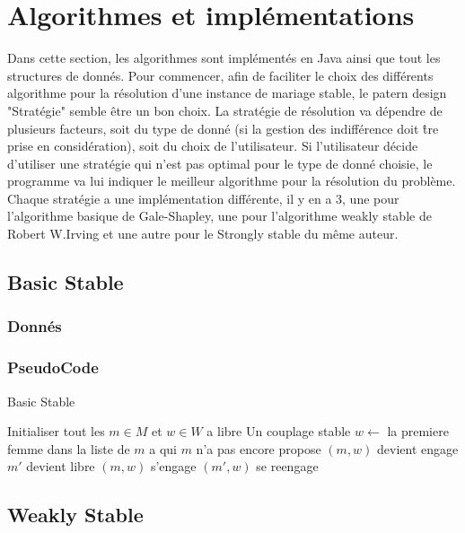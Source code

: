 \documentclass[11pt]{article}
\begin{document}
\section{Algorithmes et impl\'ementations}\label{algo}
Dans cette section, les algorithmes sont impl\'ement\'es en Java ainsi que tout
les structures de donn\'es. Pour commencer, afin de faciliter le choix des
diff\'erents algorithme pour la r\'esolution d'une instance de mariage stable,
le patern design "Strat\'egie" semble \^etre un bon choix. La strat\'egie de
r\'esolution va d\'ependre de plusieurs facteurs, soit du type de donn\'e (si
la gestion des indiff\'erence doit \^tre prise en consid\'eration), soit du
choix de l'utilisateur. Si l'utilisateur d\'ecide d'utiliser une strat\'egie
qui n'est pas optimal pour le type de donn\'e choisie, le programme va lui
indiquer le meilleur algorithme pour la r\'esolution du probl\`eme. Chaque
strat\'egie a une impl\'ementation diff\'erente, il y en a 3, une pour
l'algorithme basique de Gale-Shapley, une pour l'algorithme weakly stable de
Robert W.Irving et une autre pour le Strongly stable du m\^eme auteur.
\subsection{Basic Stable}

\subsubsection{Donn\'es}
\subsubsection{PseudoCode}
\begin{algorithm}
\caption{Basic Stable}
\begin{algorithmic} 
\REQUIRE Initialiser tout les $m \in M$ et $w \in W$ a libre
\ENSURE Un couplage stable
\STATE $w \leftarrow$ la premiere femme dans la liste de $m$ a qui $m$ n'a pas
encore propose
\STATE $(m, w)$ devient engage
\STATE $m'$ devient libre
\STATE $(m, w)$ s'engage
\ELSE
\STATE $(m', w)$ se reengage
\ENDIF
\ENDIF
\ENDWHILE
\end{algorithmic}
\end{algorithm}
    
\subsection{Weakly Stable}
\end{document}
